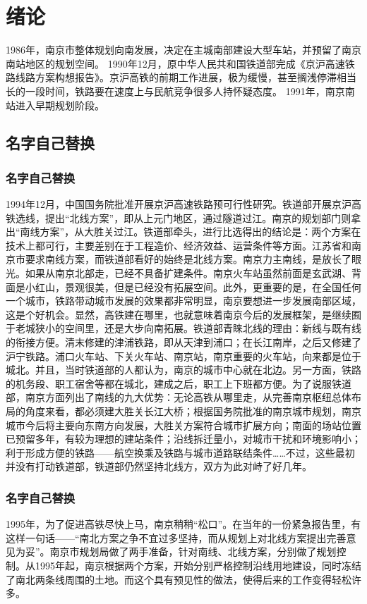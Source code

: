 \documentclass[bachelor]{njupthesis}
\begin{document}
\thesistableofcontents

\thesischapterexordium

\chapter{绪论}
1986年，南京市整体规划向南发展，决定在主城南部建设大型车站，并预留了南京南站地区的规划空间。
1990年12月，原中华人民共和国铁道部完成《京沪高速铁路线路方案构想报告》。京沪高铁的前期工作进展，极为缓慢，甚至搁浅停滞相当长的一段时间，铁路要在速度上与民航竞争很多人持怀疑态度。
1991年，南京南站进入早期规划阶段。

\section{名字自己替换}
\subsection{名字自己替换}
1994年12月，中国国务院批准开展京沪高速铁路预可行性研究。铁道部开展京沪高铁选线，提出“北线方案”，即从上元门地区，通过隧道过江。南京的规划部门则拿出“南线方案”，从大胜关过江。铁道部牵头，进行比选得出的结论是：两个方案在技术上都可行，主要差别在于工程造价、经济效益、运营条件等方面。江苏省和南京市要求南线方案，而铁道部看好的始终是北线方案。南京力主南线，是放长了眼光。如果从南京北部走，已经不具备扩建条件。南京火车站虽然前面是玄武湖、背面是小红山，景观很美，但是已经没有拓展空间。此外，更重要的是，在全国任何一个城市，铁路带动城市发展的效果都非常明显，南京要想进一步发展南部区域，这是个好机会。显然，高铁建在哪里，也就意味着南京今后的发展框架，是继续囿于老城狭小的空间里，还是大步向南拓展。铁道部青睐北线的理由：新线与既有线的衔接方便。清末修建的津浦铁路，即从天津到浦口；在长江南岸，之后又修建了沪宁铁路。浦口火车站、下关火车站、南京站，南京重要的火车站，向来都是位于城北。并且，当时铁道部的人都认为，南京的城市中心就在北边。另一方面，铁路的机务段、职工宿舍等都在城北，建成之后，职工上下班都方便。为了说服铁道部，南京方面列出了南线的九大优势：无论高铁从哪里走，从完善南京枢纽总体布局的角度来看，都必须建大胜关长江大桥；根据国务院批准的南京城市规划，南京城市今后将主要向东南方向发展，大胜关方案符合城市扩展方向；南面的场站位置已预留多年，有较为理想的建站条件；沿线拆迁量小，对城市干扰和环境影响小；利于形成方便的铁路——航空换乘及铁路与城市道路联结条件……不过，这些最初并没有打动铁道部，铁道部仍然坚持北线方，双方为此对峙了好几年。


\subsection{名字自己替换}
1995年，为了促进高铁尽快上马，南京稍稍“松口”。在当年的一份紧急报告里，有这样一句话——“南北方案之争不宜过多坚持，而从规划上对北线方案提出完善意见为妥”。南京市规划局做了两手准备，针对南线、北线方案，分别做了规划控制。从1995年起，南京根据两个方案，开始分别严格控制沿线用地建设，同时冻结了南北两条线周围的土地。而这个具有预见性的做法，使得后来的工作变得轻松许多。
\end{document}
